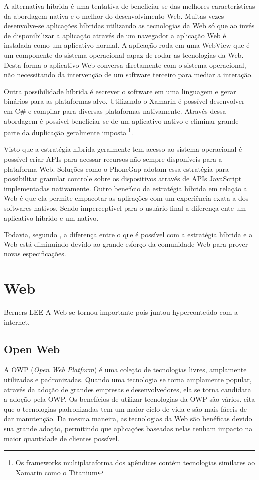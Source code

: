 A alternativa híbrida é uma tentativa de beneficiar-se das melhores
características da abordagem nativa e o melhor do desenvolvimento
Web. Muitas vezes desenvolve-se aplicações híbridas utilizando as
tecnologias da Web só que ao invés de disponibilizar a aplicação
através de um navegador a aplicação Web é instalada como um
aplicativo normal. A aplicação roda em uma WebView que é um
componente do sistema operacional capaz de rodar as tecnologias da
Web. Desta forma o aplicativo Web conversa diretamente com o sistema
operacional, não necessitando da intervenção de um software terceiro
para mediar a interação.

Outra possibilidade híbrida é escrever o software em uma linguagem
e gerar binários para as plataformas alvo. Utilizando o Xamarin é
possível desenvolver em C\# e compilar para diversas plataformas
nativamente. Através dessa abordagem é possível beneficiar-se de um
aplicativo nativo e eliminar grande parte da duplicação geralmente
imposta \footnote{Os frameworks multiplataforma dos apêndices contém
tecnologias similares ao Xamarin como o Titanium}.

Visto que a estratégia híbrida geralmente tem acesso ao sistema
operacional é possível criar APIs para acessar recursos não sempre
disponíveis para a plataforma Web. Soluções como o PhoneGap
adotam essa estratégia para possibilitar granular controle sobre os
dispositivos através de APIs JavaScript implementadas nativamente.
Outro benefício da estratégia híbrida em relação a Web é que
ela permite empacotar as aplicações com um experiência exata a
dos softwares nativos. Sendo imperceptível para o usuário final a
diferença ente um aplicativo híbrido e um nativo.

Todavia, segundo \citet[p. 8]{aSeriousContender}, a diferença entre o
que é possível com a estratégia híbrida e a Web está diminuindo
devido ao grande esforço da comunidade Web para prover novas
especificações.

\section{Web}
Berners LEE
A Web se tornou importante pois juntou hyperconteúdo com a internet.

\subsection{Open Web}

A OWP (\textit{Open Web Platform}) é uma coleção de tecnologias
livres, amplamente utilizadas e padronizadas. Quando uma tecnologia
se torna amplamente popular, através da adoção de grandes empresas
e desenvolvedores, ela se torna candidata a adoção pela OWP. Os
benefícios de utilizar tecnologias da OWP são vários. \citet[p.
3]{svgTime} cita que o tecnologias padronizadas tem um maior ciclo de
vida e são mais fáceis de dar manutenção. Da mesma maneira, as tecnologias
da Web são benéficas devido sua grande adoção, permitindo que
aplicações baseadas nelas tenham impacto na maior quantidade de
clientes possível.

